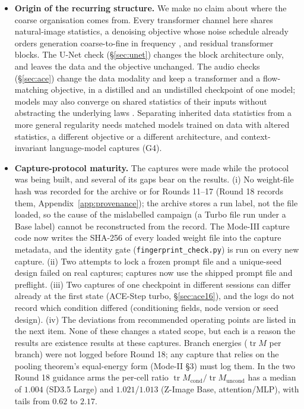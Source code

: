 \documentclass[11pt]{article}
\begin{document}
\begin{itemize}
 \item \textbf{Origin of the recurring structure.} We make no claim about where the coarse organisation comes from. Every transformer channel here shares natural-image statistics, a denoising objective whose noise schedule already orders generation coarse-to-fine in frequency \citep{falck2025fourier}, and residual transformer blocks. The U-Net check (\S\ref{sec:unet}) changes the block architecture only, and leaves the data and the objective unchanged. The audio checks (\S\ref{sec:ace}) change the data modality and keep a transformer and a flow-matching objective, in a distilled and an undistilled checkpoint of one model; models may also converge on shared statistics of their inputs \citep{huh2024platonic} without abstracting the underlying laws \citep{kang2025videophysics}. Separating inherited data statistics from a more general regularity needs matched models trained on data with altered statistics, a different objective or a different architecture, and context-invariant language-model captures (G4).
 \item \textbf{Capture-protocol maturity.} The captures were made while the protocol was being built, and several of its gaps bear on the results. (i) No weight-file hash was recorded for the archive or for Rounds 11--17 (Round 18 records them, Appendix~\ref{app:provenance}); the archive stores a run label, not the file loaded, so the cause of the mislabelled campaign (a Turbo file run under a Base label) cannot be reconstructed from the record. The Mode-III capture code now writes the SHA-256 of every loaded weight file into the capture metadata, and the identity gate (\texttt{fingerprint\_check.py}) is run on every new capture. (ii) Two attempts to lock a frozen prompt file and a unique-seed design failed on real captures; captures now use the shipped prompt file and preflight. (iii) Two captures of one checkpoint in different sessions can differ already at the first state (ACE-Step turbo, \S\ref{sec:ace16}), and the logs do not record which condition differed (conditioning fields, node version or seed design). (iv) The deviations from recommended operating points are listed in the next item. None of these changes a stated scope, but each is a reason the results are existence results at these captures. Branch energies ($\operatorname{tr}M$ per branch) were not logged before Round 18; any capture that relies on the pooling theorem's equal-energy form (Mode-II \S3) must log them. In the two Round 18 guidance arms the per-cell ratio $\operatorname{tr}M_{\mathrm{cond}}/\operatorname{tr}M_{\mathrm{uncond}}$ has a median of $1.004$ (SD3.5 Large) and $1.021$/$1.013$ (Z-Image Base, attention/MLP), with tails from $0.62$ to $2.17$.

\end{itemize}
\end{document}
